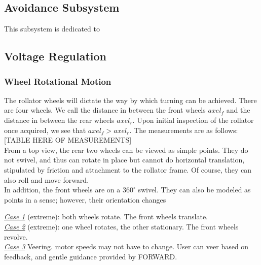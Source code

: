 \subsection{Avoidance Subsystem}

\noindent This subsystem is dedicated to 

\subsection{Voltage Regulation}


\subsubsection{Wheel Rotational Motion}
\noindent The rollator wheels will dictate the way by which turning can be achieved. There are four wheels. We call the distance in between the front wheels $axel_f$ and the distance in between the rear wheels $axel_r$. Upon initial inspection of the rollator once acquired, we see that $axel_f > axel_r$. The measurements are as follows:\\

[TABLE HERE OF MEASUREMENTS]\\

\noindent From a top view, the rear two wheels can be viewed as simple points. They do not swivel, and thus can rotate in place but cannot do horizontal translation, stipulated by friction and attachment to the rollator frame. Of course, they can also roll and move forward.\\

\noindent In addition, the front wheels are on a $360^{\circ}$ swivel. They can also be modeled as points in a sense; however, their orientation changes

\noindent \underline{\textit{Case 1}} (extreme): both wheels rotate. The front wheels translate.\\

\noindent \underline{\textit{Case 2}} (extreme): one wheel rotates, the other stationary. The front wheels revolve.\\

\noindent \underline{\textit{Case 3}} Veering. motor speeds may not have to change. User can veer based on feedback, and gentle guidance provided by FORWARD.\\


